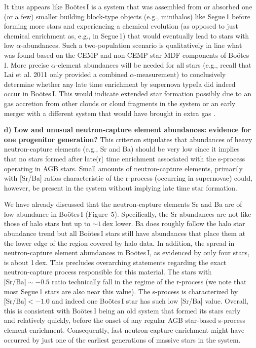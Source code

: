 \documentclass[]{emulateapj}
\begin{document}
It thus appears like Bo\"otes\,I is a system that was assembled from
or absorbed one (or a few) smaller building block-type objects (e.g.,
minihalos) like Segue\,1 before forming more stars and experiencing a
chemical evolution (as opposed to just chemical enrichment as, e.g.,
in Segue\,1) that would eventually lead to stars with low
$\alpha$-abundances. Such a two-population scenario is qualitatively
in line what was found based on the CEMP and non-CEMP star MDF
components of Bo\"otes\,I. More precise $\alpha$-element abundances
will be needed for all stars (e.g., recall that Lai et al. 2011 only
provided a combined $\alpha$-measurement) to conclusively determine
whether any late time enrichment by supernova type\.Ia did indeed
occur in Bo\"otes\,I. This would indicate extended star formation
possibly due to an gas accretion from other clouds or cloud fragments
in the system or an early merger with a different system that would
have brought in extra gas \citep{smith15}.



\textbf{d) Low and unusual neutron-capture element abundances: evidence
  for one progenitor generation?}  This criterion stipulates that 
abundances of heavy neutron-capture elements (e.g., Sr and Ba) should
be very low since it implies that no stars formed after late(r) time
enrichment associated with the s-process operating in AGB stars. Small
amounts of neutron-capture elements, primarily with [Sr/Ba] ratios
characteristic of the r-process (occurring in supernovae) could, however,
be present in the system without implying late time star formation.

We have already discussed that the neutron-capture elements Sr and Ba are
of low abundance in Bo\"otes\,I (Figure~5). Specifically, the Sr
abundances are not like those of halo stars but up to $\sim1$\,dex
lower. Ba does roughly follow the halo star abundance trend but all
Bo\"otes\,I stars still have abundances that place them at the lower
edge of the region covered by halo data. In addition, the spread in
neutron-capture element abundances in Bo\"otes\,I, as evidenced by
only four stars, is about 1\,dex. This precludes overarching
statements regarding the exact neutron-capture process responsible for
this material.  The stars with $\mbox{[Sr/Ba]}\sim-0.5$ ratio
technically fall in the regime of the r-process (we note that most
Segue\,1 stars are also near this value). The s-process is
characterized by $\mbox{[Sr/Ba]}<-1.0$ and indeed one Bo\"otes\,I star
has such low [Sr/Ba] value. Overall, this is consistent with
Bo\"otes\,I being an old system that formed its stars early and
relatively quickly, before the onset of any regular AGB star-based
s-process element enrichment. Consequently, fast neutron-capture
enrichment might have occurred by just one of the earliest generations
of massive stars in the system.
\end{document}
